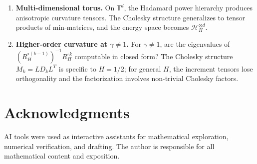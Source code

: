 \documentclass[11pt,a4paper]{article}
\theoremstyle{plain}
\theoremstyle{definition}
\theoremstyle{remark}
\newcommand{\T}{\mathbb{T}}
\newcommand{\HH}{\mathcal{H}_H}
\begin{document}
\begin{enumerate}[label=(\roman*)]
\item \textbf{Multi-dimensional torus.}
  On $\T^d$, the Hadamard power hierarchy produces
  anisotropic curvature tensors.  The Cholesky
  structure generalizes to tensor products of
  min-matrices, and the energy space becomes
  $\HH^{\otimes d}$.

\item \textbf{Higher-order curvature at $\gamma \neq 1$.}
  For $\gamma \neq 1$, are the eigenvalues of
  $(R_H^{\circ(k-1)})^{-1}R_H^{\circ k}$ computable
  in closed form?  The Cholesky structure
  $M_k = LD_kL^T$ is specific to $H = 1/2$;
  for general $H$, the increment tensors lose
  orthogonality and the factorization involves
  non-trivial Cholesky factors.
\end{enumerate}


\section*{Acknowledgments}
AI tools were used as interactive assistants for mathematical
exploration, numerical verification, and drafting. The author
is responsible for all mathematical content and exposition.
\end{document}
